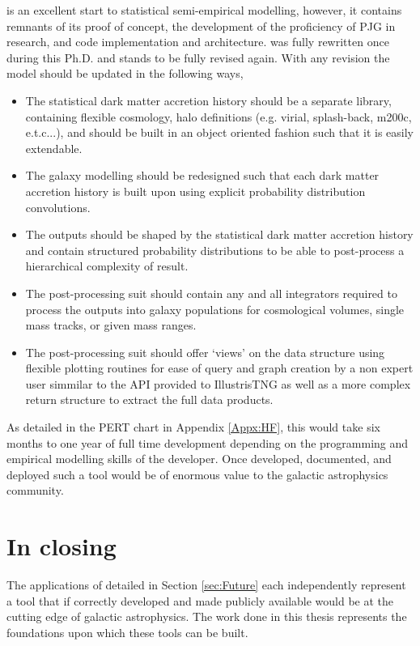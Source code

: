 \steel is an excellent start to statistical semi-empirical modelling, however, it contains remnants of its proof of concept, the development of the proficiency of PJG in research, and code implementation and architecture. \steel was fully rewritten once during this Ph.D. and stands to be fully revised again. With any revision the model should be updated in the following ways,

\begin{itemize}
    \item The statistical dark matter accretion history should be a separate library, containing flexible cosmology, halo definitions (e.g. virial, splash-back, m200c, e.t.c...), and should be built in an object oriented fashion such that it is easily extendable.
    \item The galaxy modelling should be redesigned such that each dark matter accretion history is built upon using explicit probability distribution convolutions.
    \item The outputs should be shaped by the statistical dark matter accretion history and contain structured probability distributions to be able to post-process a hierarchical complexity of result.
    \item The post-processing suit should contain any and all integrators required to process the outputs into galaxy populations for cosmological volumes, single mass tracks, or given mass ranges.
    \item The post-processing suit should offer `views' on the data structure using flexible plotting routines for ease of query and graph creation by a non expert user simmilar to the API provided to IllustrisTNG \cite[][https://www.tng-project.org/data/vis/]{Nelson2019TheRelease} as well as a more complex return structure to extract the full data products.
\end{itemize}

As detailed in the PERT chart in Appendix \ref{Appx:HF}, this would take six months to one year of full time development depending on the programming and empirical modelling skills of the developer. Once developed, documented, and deployed such a tool would be of enormous value to the galactic astrophysics community. 

\section{In closing}

The applications of \steel detailed in Section \ref{sec:Future} each independently represent a tool that if correctly developed and made publicly available would be at the cutting edge of galactic astrophysics. The work done in this thesis represents the foundations upon which these tools can be built. 

